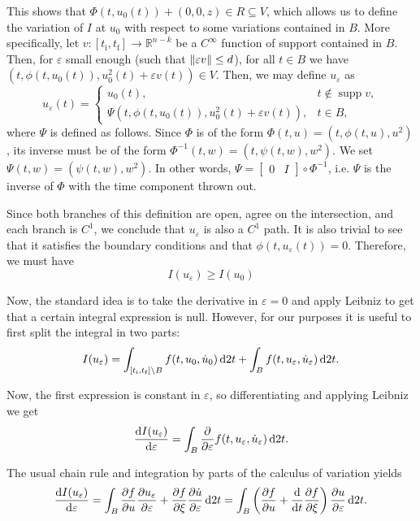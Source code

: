 \documentclass{article}
\theoremstyle{plain}
\theoremstyle{plain}
\theoremstyle{nonumberplain}
\theoremstyle{empty}
\newcommand{\R}{\mathbb{R}}
\newcommand{\tstart}{\mathrm{i}}
\newcommand{\tend}{\mathrm{f}}
\DeclarePairedDelimiter\norm{\lVert}{\rVert}
\DeclareMathOperator{\supp}{supp}
\begin{document}
\begin{itemize}
This shows that $\Phi(t,u_0(t)) + (0,0,z) \in R \subseteq V$, which allows us to define the variation of $I$ at $u_0$ with respect to some variations contained in $B$. More specifically, let $v : [t_\tstart, t_\tend] \to \R^{n-k}$ be a $C^\infty$ function of support contained in $B$. Then, for $\varepsilon$ small enough (such that $\norm{\varepsilon v} \leq d$), for all $t \in B$ we have $(t, \phi(t,u_0(t)), u_0^2(t) + \varepsilon v(t)) \in V$. Then, we may define $u_\varepsilon$ as
\[
u_\varepsilon(t) =
\begin{cases}
u_0(t), & t \not \in \supp v,\\
\Psi(t, \phi(t,u_0(t)), u_0^2(t) + \varepsilon v(t)), & t \in B,
\end{cases}
\]
where $\Psi$ is defined as follows. Since $\Phi$ is of the form $\Phi(t,u) = (t, \phi(t,u), u^2)$, its inverse must be of the form $\Phi^{-1}(t,w) = (t, \psi(t,w), w^2)$. We set $\Psi(t,w) = (\psi(t,w), w^2)$. In other words, $\Psi = \begin{bmatrix} 0 & I \end{bmatrix} \circ \Phi^{-1}$, i.e. $\Psi$ is the inverse of $\Phi$ with the time component thrown out.

Since both branches of this definition are open, agree on the intersection, and each branch is $C^1$, we conclude that $u_\varepsilon$ is also a $C^1$ path. It is also trivial to see that it satisfies the boundary conditions and that $\phi(t, u_\varepsilon(t)) = 0$. Therefore, we must have
\[I(u_\varepsilon) \geq I(u_0)\]

Now, the standard idea is to take the derivative in $\varepsilon = 0$ and apply Leibniz to get that a certain integral expression is null. However, for our purposes it is useful to first split the integral in two parts:
\[I(u_\varepsilon) = \int_{[t_\tstart,t_\tend] \setminus B} f(t,u_0,\dot u_0) \dl2 t + \int_B f(t,u_\varepsilon, \dot u_\varepsilon) \dl2 t.\]

Now, the first expression is constant in $\varepsilon$, so differentiating and applying Leibniz we get
\[\diff{I(u_\varepsilon)}\varepsilon = \int_B \diffp*{f(t,u_\varepsilon, \dot u_\varepsilon)}\varepsilon \dl2 t.\]

The usual chain rule and integration by parts of the calculus of variation yields
\[
\diff{I(u_\varepsilon)}\varepsilon = \int_B \diffp f u \diffp{u_\varepsilon}\varepsilon + \diffp f {\xi} \diffp{\dot u}\varepsilon \dl2 t = \int_B \left( \diffp f u + \diff*{\diffp f {\xi}}t \right) \diffp{u}\varepsilon \dl2 t.
\]


\end{itemize}
\end{document}
